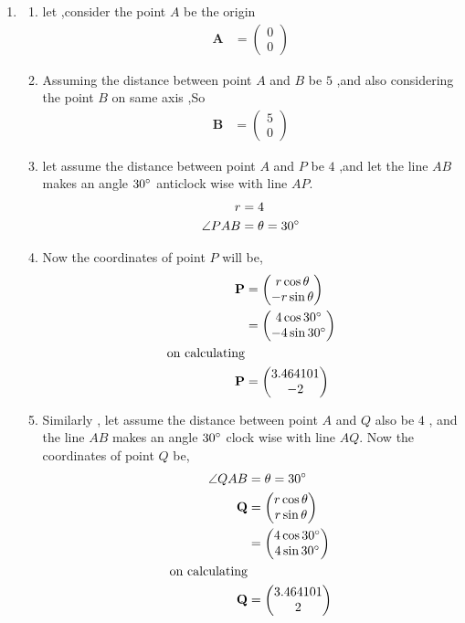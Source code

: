 \documentclass[11pt, a4paper]{article}
\newcommand{\myvec}[1]{\ensuremath{\begin{pmatrix}#1\end{pmatrix}}}
\let\vec\mathbf
\begin{document}
\begin{enumerate}
\item
\begin{enumerate}

\item let ,consider the point $A$ be the origin 
\begin{align}
\vec{A} &= \myvec{0 \\ 0}
\end{align}

\item Assuming the distance between point $A$ and $B$ be $5$ ,and also considering the point $B$ on same axis ,So
\begin{align}
\vec{B} &= \myvec{5 \\ 0}
\end{align}

\item let assume the distance between point $A$ and $P$ be $4$ ,and let the line $AB$ makes an angle $30 \degree$ anticlock wise with line $AP$.
\begin{align}
r &= 4  \\
\angle PAB &= \theta = 30 \degree
\end{align}

\item Now the coordinates of point $P$ will be,
\begin{align}
\vec{P} &= \myvec{r \cos \theta \\ -r \sin \theta} \\
	&= \myvec{4 \cos 30 \degree \\ -4 \sin 30 \degree} \\
\text{on calculating} \nonumber \\
\vec{P} &= \myvec{3.464101 \\ -2} 
\end{align}

\item Similarly , let assume the distance between point $A$ and $Q$ also be $4$ , and the line $AB$ makes an angle $30 \degree$ clock wise with line $AQ$. Now the coordinates of point $Q$ be,
\begin{align}
\angle QAB &= \theta = 30 \degree \\
\vec{Q} &= \myvec{r \cos \theta \\ r \sin \theta} \\
	&= \myvec{4 \cos 30 \degree \\ 4 \sin 30 \degree} \\
\text{on calculating} \nonumber \\
\vec{Q} &= \myvec{3.464101 \\ 2} 
\end{align}


\end{enumerate}
\end{enumerate}
\end{document}
